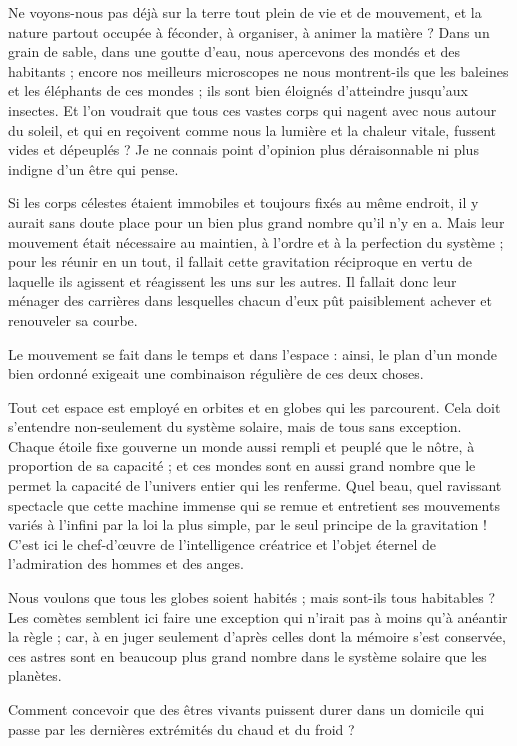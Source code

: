 \documentclass[a4paper, 11pt, oneside, landscape]{article}
\begin{document}
Ne voyons-nous pas déjà sur la terre tout plein de vie et de mouvement, et la nature partout occupée à féconder, à organiser, à animer la matière ? Dans un grain de sable, dans une goutte d'eau, nous apercevons des mondés et des habitants ; encore nos meilleurs microscopes ne nous montrent-ils que les baleines et les éléphants de ces mondes ; ils sont bien éloignés d'atteindre jusqu'aux insectes. Et l'on voudrait que tous ces vastes corps qui nagent avec nous autour du soleil, et qui en reçoivent comme nous la lumière et la chaleur vitale, fussent vides et dépeuplés ? Je ne connais point d'opinion plus déraisonnable ni plus indigne d'un être qui pense.

Si les corps célestes étaient immobiles et toujours fixés au même endroit, il y aurait sans doute place pour un bien plus grand nombre qu'il n'y en a. Mais leur mouvement était nécessaire au maintien, à l'ordre et à la perfection du système ; pour les réunir en un tout, il fallait cette gravitation réciproque en vertu de laquelle ils agissent et réagissent les uns sur les autres. Il fallait donc leur ménager des carrières dans lesquelles chacun d'eux pût paisiblement achever et renouveler sa courbe.

Le mouvement se fait dans le temps et dans l'espace : ainsi, le plan d'un monde bien ordonné exigeait une combinaison régulière de ces deux choses.

Tout cet espace est employé en orbites et en globes qui les parcourent. Cela doit s'entendre non-seulement du système solaire, mais de tous sans exception. Chaque étoile fixe gouverne un monde aussi rempli et peuplé que le nôtre, à proportion de sa capacité ; et ces mondes sont en aussi grand nombre que le permet la capacité de l'univers entier qui les renferme. Quel beau, quel ravissant spectacle que cette machine immense qui se remue et entretient ses mouvements variés à l'infini par la loi la plus simple, par le seul principe de la gravitation ! C'est ici le chef-d'œuvre de l'intelligence créatrice et l'objet éternel de l'admiration des hommes et des anges.

Nous voulons que tous les globes soient habités ; mais sont-ils tous habitables ? Les comètes semblent ici faire une exception qui n'irait pas à moins qu'à anéantir la règle ; car, à en juger seulement d'après celles dont la mémoire s'est conservée, ces astres sont en beaucoup plus grand nombre dans le système solaire que les planètes.

Comment concevoir que des êtres vivants puissent durer dans un domicile qui passe par les dernières extrémités du chaud et du froid ?
\end{document}
